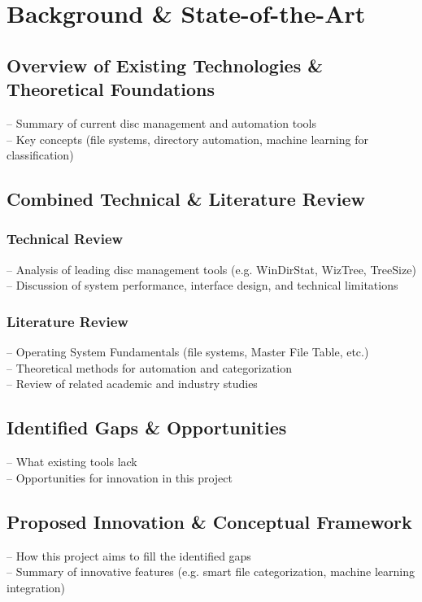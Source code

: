 \section{Background \& State-of-the-Art}

\subsection{Overview of Existing Technologies \& Theoretical Foundations}
– Summary of current disc management and automation tools\\
– Key concepts (file systems, directory automation, machine learning for classification)
\subsection{Combined Technical \& Literature Review}
\subsubsection{Technical Review}
– Analysis of leading disc management tools (e.g. WinDirStat, WizTree, TreeSize)\\
– Discussion of system performance, interface design, and technical limitations
\subsubsection{Literature Review}
– Operating System Fundamentals (file systems, Master File Table, etc.)\\
– Theoretical methods for automation and categorization\\
– Review of related academic and industry studies
\subsection{Identified Gaps \& Opportunities}
– What existing tools lack\\
– Opportunities for innovation in this project
\subsection{Proposed Innovation \& Conceptual Framework}
– How this project aims to fill the identified gaps\\
– Summary of innovative features (e.g. smart file categorization, machine learning integration)